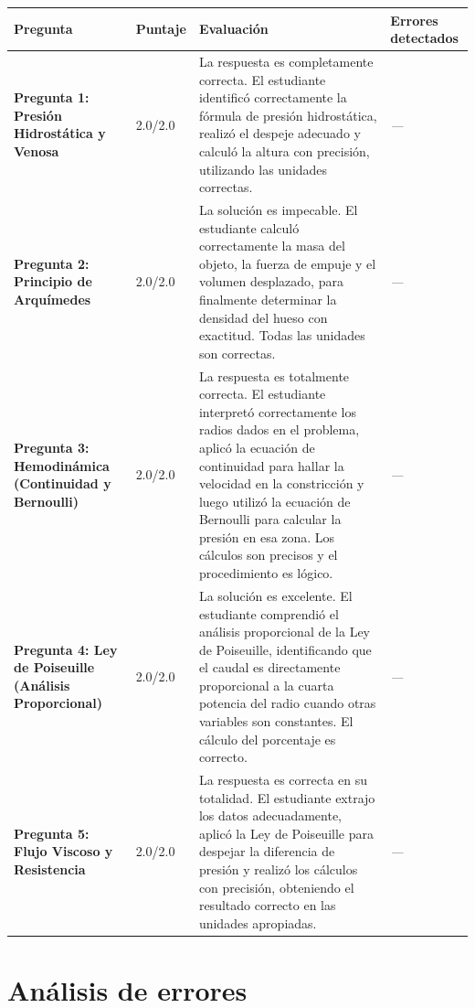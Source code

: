 \documentclass[11pt,a4paper]{article}
\begin{document}
\begin{longtable}{>{\bfseries}p{2.8cm} p{1.6cm} p{7.0cm} p{2.8cm}}
  \toprule
  \textbf{Pregunta} & \textbf{Puntaje} & \textbf{Evaluación} & \textbf{Errores detectados} \\
  \midrule
  \endhead
  \bottomrule
  \endfoot
    \textbf{Pregunta 1: Presión Hidrostática y Venosa} & 2.0/2.0 & La respuesta es completamente correcta. El estudiante identificó correctamente la fórmula de presión hidrostática, realizó el despeje adecuado y calculó la altura con precisión, utilizando las unidades correctas. & \textit{---} \\
    \midrule
    \textbf{Pregunta 2: Principio de Arquímedes} & 2.0/2.0 & La solución es impecable. El estudiante calculó correctamente la masa del objeto, la fuerza de empuje y el volumen desplazado, para finalmente determinar la densidad del hueso con exactitud. Todas las unidades son correctas. & \textit{---} \\
    \midrule
    \textbf{Pregunta 3: Hemodinámica (Continuidad y Bernoulli)} & 2.0/2.0 & La respuesta es totalmente correcta. El estudiante interpretó correctamente los radios dados en el problema, aplicó la ecuación de continuidad para hallar la velocidad en la constricción y luego utilizó la ecuación de Bernoulli para calcular la presión en esa zona. Los cálculos son precisos y el procedimiento es lógico. & \textit{---} \\
    \midrule
    \textbf{Pregunta 4: Ley de Poiseuille (Análisis Proporcional)} & 2.0/2.0 & La solución es excelente. El estudiante comprendió el análisis proporcional de la Ley de Poiseuille, identificando que el caudal es directamente proporcional a la cuarta potencia del radio cuando otras variables son constantes. El cálculo del porcentaje es correcto. & \textit{---} \\
    \midrule
    \textbf{Pregunta 5: Flujo Viscoso y Resistencia} & 2.0/2.0 & La respuesta es correcta en su totalidad. El estudiante extrajo los datos adecuadamente, aplicó la Ley de Poiseuille para despejar la diferencia de presión y realizó los cálculos con precisión, obteniendo el resultado correcto en las unidades apropiadas. & \textit{---} \\
    \midrule
\end{longtable}

\section*{Análisis de errores}
\end{document}
